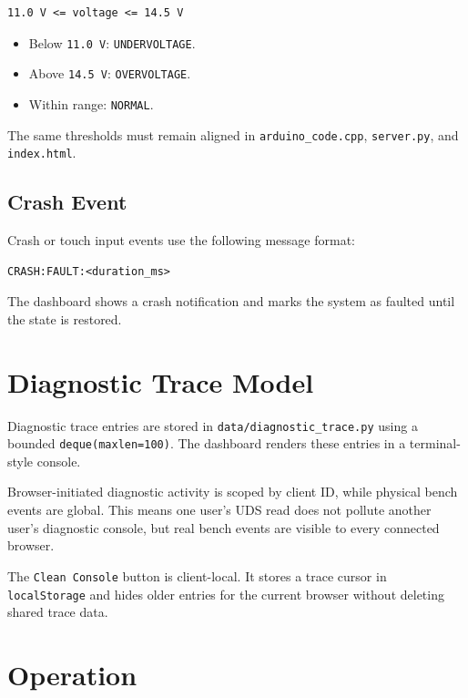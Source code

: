 \documentclass[a4paper,10pt,titlepage,oneside]{article}
\begin{document}
\begin{lstlisting}
11.0 V <= voltage <= 14.5 V
\end{lstlisting}

\begin{itemize}[leftmargin=*]
    \item Below \texttt{11.0 V}: \texttt{UNDERVOLTAGE}.
    \item Above \texttt{14.5 V}: \texttt{OVERVOLTAGE}.
    \item Within range: \texttt{NORMAL}.
\end{itemize}

The same thresholds must remain aligned in \texttt{arduino\_code.cpp},
\texttt{server.py}, and \texttt{index.html}.

\subsection{Crash Event}

Crash or touch input events use the following message format:

\begin{lstlisting}
CRASH:FAULT:<duration_ms>
\end{lstlisting}

The dashboard shows a crash notification and marks the system as faulted until
the state is restored.

\section{Diagnostic Trace Model}

Diagnostic trace entries are stored in \texttt{data/diagnostic\_trace.py} using
a bounded \texttt{deque(maxlen=100)}. The dashboard renders these entries in a
terminal-style console.

Browser-initiated diagnostic activity is scoped by client ID, while physical
bench events are global. This means one user's UDS read does not pollute another
user's diagnostic console, but real bench events are visible to every connected
browser.

The \texttt{Clean Console} button is client-local. It stores a trace cursor in
\texttt{localStorage} and hides older entries for the current browser without
deleting shared trace data.

\section{Operation}
\end{document}
